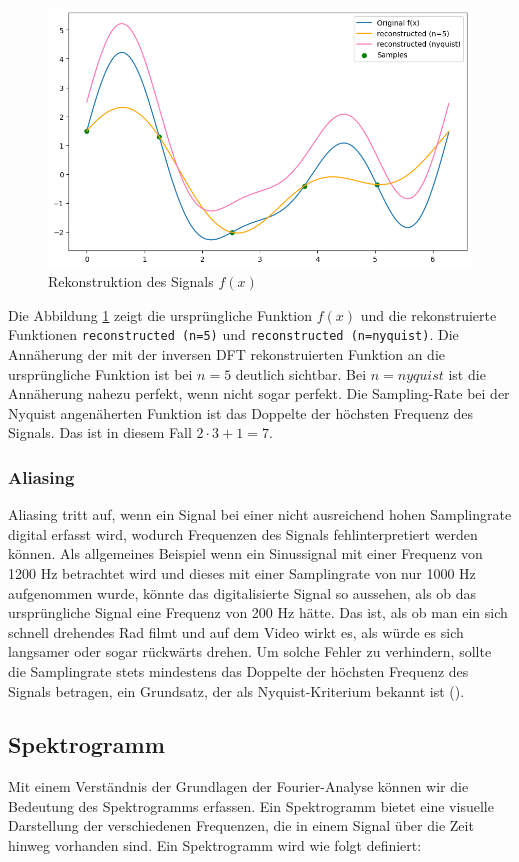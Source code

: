 \documentclass[11pt,a4paper]{article}
\begin{document}
\begin{figure}[h]
	\centering
	\includegraphics[width=0.60\linewidth]{img/dft_reconstructed.png}
	\caption{Rekonstruktion des Signals \(f(x)\)}
	\label{fig:dft_example_reconstructed}
\end{figure}

\noindent
\newline
Die Abbildung \ref{fig:dft_example_reconstructed} zeigt die ursprüngliche Funktion \(f(x)\) und die
rekonstruierte Funktionen \texttt{reconstructed (n=5)} und \texttt{reconstructed (n=nyquist)}.
Die Annäherung der mit der inversen DFT rekonstruierten Funktion an die ursprüngliche Funktion ist
bei \(n=5\) deutlich sichtbar. Bei \(n=nyquist\) ist die Annäherung nahezu perfekt, wenn nicht sogar
perfekt. Die Sampling-Rate bei der Nyquist angenäherten Funktion ist das Doppelte der höchsten
Frequenz des Signals. Das ist in diesem Fall \(2 \cdot 3 + 1 = 7\).

\subsubsection{Aliasing}
Aliasing tritt auf, wenn ein Signal bei einer nicht ausreichend hohen Samplingrate digital erfasst
wird, wodurch Frequenzen des Signals fehlinterpretiert werden können. Als allgemeines Beispiel wenn
ein Sinussignal mit einer Frequenz von 1200 Hz betrachtet wird und dieses mit einer Samplingrate
von nur 1000 Hz aufgenommen wurde, könnte das digitalisierte Signal so aussehen, als ob das
ursprüngliche Signal eine Frequenz von 200 Hz hätte. Das ist, als ob man ein sich schnell
drehendes Rad filmt und auf dem Video wirkt es, als würde es sich langsamer oder sogar rückwärts
drehen. Um solche Fehler zu verhindern, sollte die Samplingrate stets mindestens das
Doppelte der höchsten Frequenz des Signals betragen, ein Grundsatz, der als Nyquist-Kriterium
bekannt ist (\cite[]{weitz2023fourier}).

\subsection{Spektrogramm}
Mit einem Verständnis der Grundlagen der Fourier-Analyse können wir die Bedeutung des Spektrogramms
erfassen. Ein Spektrogramm bietet eine visuelle Darstellung der verschiedenen Frequenzen, die in
einem Signal über die Zeit hinweg vorhanden sind. Ein Spektrogramm wird wie folgt definiert:
\end{document}
